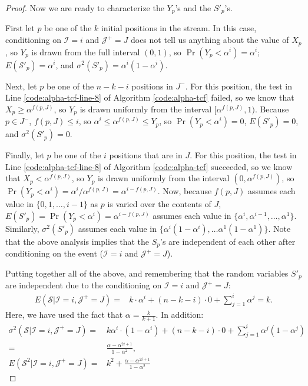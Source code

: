 \documentclass{article}
\begin{document}
\begin{proof}
Now we are ready to characterize the $Y_p$'s and the $S'_p$'s. 

First let $p$ be one of the $k$ initial positions in the stream.
In this case, conditioning on $\mathcal{I}=i$ and $\mathcal{J}^+=J$ does not tell us anything about the value of $X_p$,
so $Y_p$ is drawn from the full interval $(0,1)$, so $\Pr(Y_p < \alpha^i) = \alpha^i$;
$E(\mathcal{S}'_p) = \alpha^i$, and $\sigma^2(S'_p) = \alpha^i (1 - \alpha^i)$.

Next, let $p$ be one of the $n-k-i$ positions in $J^-$. 
For this position, the test in 
Line \ref{code:alpha-tcf-line-8} of Algorithm \ref{code:alpha-tcf}
failed, so we know that $X_p \ge \alpha^{f(p,J)}$,
so $Y_p$ is drawn uniformly from the interval $[\alpha^{f(p,J)},1)$. Because $p \in J^-$,
$f(p,J) \le i$, so $\alpha^i \le \alpha^{f(p,J)} \le Y_p$, 
so $\Pr(Y_p < \alpha^i) = 0$, $E(S'_p) = 0$, and $\sigma^2(S'_p) = 0$.

Finally, let $p$ be one of the $i$ positions that are in $J$. For this position,
the test in 
Line \ref{code:alpha-tcf-line-8} of Algorithm \ref{code:alpha-tcf}
succeeded, so we know that $X_p < \alpha^{f(p,J)}$,
so $Y_p$ is drawn uniformly from the interval $(0,\alpha^{f(p,J)})$, so
$\Pr(Y_p < \alpha^i) = \alpha^i/\alpha^{f(p,J)} = \alpha^{i-f(p,J)}$.
Now, because $f(p,J)$ assumes each value in $\{0,1,\ldots,i-1\}$ as
$p$ is varied over the contents of $J$, $E(S'_p) = \Pr(Y_p < \alpha^i) =
\alpha^{i-f(p,J)}$ assumes each value in 
$\{\alpha^i, \alpha^{i-1}, \ldots, \alpha^1\}$.
Similarly, $\sigma^2(S'_p)$ assumes each value in
$\{
\alpha^i (1\!- \!\alpha^i),
\ldots
\alpha^1 (1\!- \!\alpha^1)
\}$. 
Note that the above analysis implies that the $S_p$'s are independent of each other after conditioning on the 
event ($\mathcal{I}=i$ and $\mathcal{J}^+=J$).

Putting together all of the above, and remembering that the random variables
$S'_p$ are independent due to the conditioning on $\mathcal{I}=i$ and $\mathcal{J}^+=J$:
\begin{align*}
E(\mathcal{S}|\mathcal{I}=i,\mathcal{J}^+=J) = & k \cdot \alpha^i + (n-k-i) \cdot 0 + \sum_{j=1}^{i} \alpha^j = k.
\end{align*}
Here, we have used the fact that $\alpha = \frac{k}{k+1}$.
In addition:
\begin{align*}
\sigma^2(\mathcal{S}| \mathcal{I}=i,\mathcal{J}^+=J) = & k \alpha^i \cdot (1 \!-\! \alpha^i) + (n\!-\!k\!-\!i) \cdot 0 + \sum_{j=1}^{i} \alpha^j (1 \!-\!\alpha^j) \\
= & \frac{\alpha - \alpha^{2i+1}}{1 - \alpha^2}, \\
E(\mathcal{S}^2|\mathcal{I}=i,\mathcal{J}^+ = J) 
= & k^2 + \frac{\alpha - \alpha^{2i+1}}{1 - \alpha^2}
\end{align*}
\end{proof}
\end{document}
